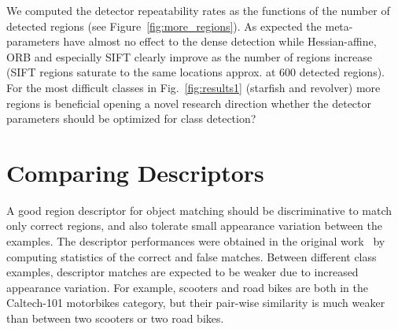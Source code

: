 \documentclass[10pt,journal,cspaper,compsoc]{IEEEtran}
\begin{document}
We computed the detector repeatability rates as the functions of the
number of detected regions (see Figure~\ref{fig:more_regions}). As
expected the meta-parameters have almost no effect to the dense detection
while Hessian-affine, ORB and especially SIFT clearly improve as the
number of regions increase (SIFT regions saturate to the same
locations approx. at 600 detected regions). For the most difficult
classes in Fig.~\ref{fig:results1} (starfish and revolver) more
regions is beneficial opening a novel
research direction whether the detector parameters should be
optimized for class detection?


%
\section{Comparing Descriptors\label{sec:descriptorcomparison}}
%
A good region descriptor for object matching should be
discriminative to match only correct regions, and also tolerate
small appearance variation between the examples.
The descriptor performances were obtained in the original
work~\cite{MikSch:2005} by computing statistics of the correct and false
matches. Between different class examples, descriptor matches are expected to
be weaker due to increased appearance variation.
For example, scooters and road bikes are both in the
Caltech-101 motorbikes category, but their pair-wise similarity
is much weaker than between two scooters or two road bikes.



\end{document}
